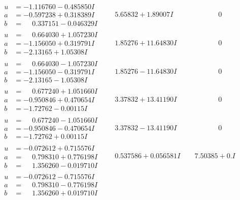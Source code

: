 \documentclass[1p]{elsarticle_modified}
\theoremstyle{definition}
\begin{document}
$$\begin{array}{c|c|c}
\begin{aligned}
u &= -1.116760 - 0.485850 I \\
a &= -0.597238 + 0.318389 I \\
b &= \phantom{-}0.337151 - 0.046329 I\end{aligned}
 & \phantom{-}5.65832 + 1.89007 I & \phantom{-0.000000 } 0 \\ \hline\begin{aligned}
u &= \phantom{-}0.664030 + 1.057230 I \\
a &= -1.156050 + 0.319791 I \\
b &= -2.13165 + 1.05308 I\end{aligned}
 & \phantom{-}1.85276 + 11.64830 I & \phantom{-0.000000 } 0 \\ \hline\begin{aligned}
u &= \phantom{-}0.664030 - 1.057230 I \\
a &= -1.156050 - 0.319791 I \\
b &= -2.13165 - 1.05308 I\end{aligned}
 & \phantom{-}1.85276 - 11.64830 I & \phantom{-0.000000 } 0 \\ \hline\begin{aligned}
u &= \phantom{-}0.677240 + 1.051660 I \\
a &= -0.950846 + 0.470654 I \\
b &= -1.72762 - 0.00115 I\end{aligned}
 & \phantom{-}3.37832 + 13.41190 I & \phantom{-0.000000 } 0 \\ \hline\begin{aligned}
u &= \phantom{-}0.677240 - 1.051660 I \\
a &= -0.950846 - 0.470654 I \\
b &= -1.72762 + 0.00115 I\end{aligned}
 & \phantom{-}3.37832 - 13.41190 I & \phantom{-0.000000 } 0 \\ \hline\begin{aligned}
u &= -0.072612 + 0.715576 I \\
a &= \phantom{-}0.798310 + 0.776198 I \\
b &= \phantom{-}1.356260 - 0.019710 I\end{aligned}
 & \phantom{-}0.537586 + 0.056581 I & \phantom{-}7.50385 + 0. I\phantom{ +0.000000I} \\ \hline\begin{aligned}
u &= -0.072612 - 0.715576 I \\
a &= \phantom{-}0.798310 - 0.776198 I \\
b &= \phantom{-}1.356260 + 0.019710 I\end{aligned}

\end{array}$$
\end{document}
